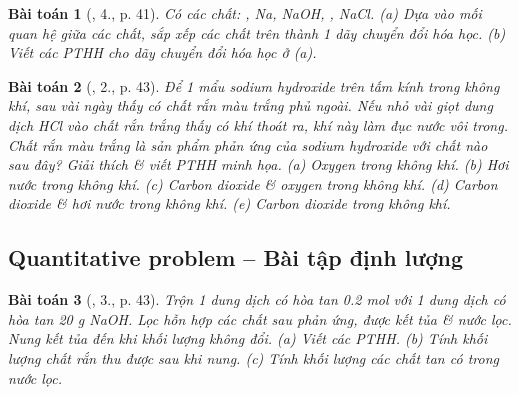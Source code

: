 \documentclass{article}
\newtheorem{baitoan}{Bài toán}
\begin{document}
\begin{baitoan}[\cite{SGK_Hoa_Hoc_9}, 4., p. 41]
	Có các chất: \emph{, Na, NaOH, , NaCl}. (a) Dựa vào mối quan hệ giữa các chất, sắp xếp các chất trên thành 1 dãy chuyển đổi hóa học. (b) Viết các PTHH cho dãy chuyển đổi hóa học ở (a).
\end{baitoan}

\begin{baitoan}[\cite{SGK_Hoa_Hoc_9}, 2., p. 43]
	Để 1 mẩu sodium hydroxide trên tấm kính trong không khí, sau vài ngày thấy có chất rắn màu trắng phủ ngoài. Nếu nhỏ vài giọt dung dịch \emph{HCl} vào chất rắn trắng thấy có khí thoát ra, khí này làm đục nước vôi trong. Chất rắn màu trắng là sản phẩm phản ứng của sodium hydroxide với chất nào sau đây? Giải thích \& viết PTHH minh họa. (a) Oxygen trong không khí. (b) Hơi nước trong không khí. (c) Carbon dioxide \& oxygen trong không khí. (d) Carbon dioxide \& hơi nước trong không khí. (e) Carbon dioxide trong không khí.
\end{baitoan}

\subsection{Quantitative problem -- Bài tập định lượng}

\begin{baitoan}[\cite{SGK_Hoa_Hoc_9}, 3., p. 43]
	Trộn 1 dung dịch có hòa tan \emph{0.2 mol } với 1 dung dịch có hòa tan \emph{20 g NaOH}. Lọc hỗn hợp các chất sau phản ứng, được kết tủa \& nước lọc. Nung kết tủa đến khi khối lượng không đổi. (a) Viết các PTHH. (b) Tính khối lượng chất rắn thu được sau khi nung. (c) Tính khối lượng các chất tan có trong nước lọc.
\end{baitoan}


\printbibliography[heading=bibintoc]
	
\end{document}

